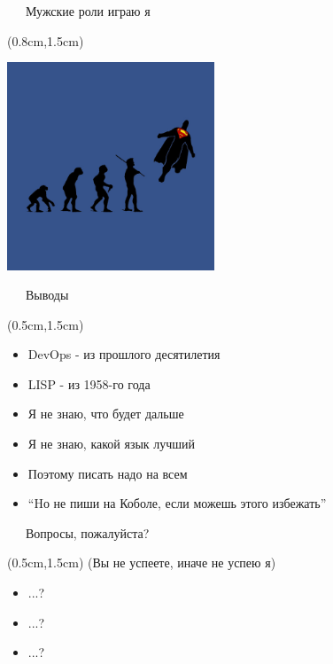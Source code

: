 \documentclass[xetex,18pt,aspectratio=43]{beamer}
\begin{document}
\begin{Large}
\begin{frame}{\ \ \ Мужские роли играю я}
\begin{textblock*}{\framewidth}(0.8cm,1.5cm)
\begin{minipage}{\textwidth}
  \centering
  \includegraphics[height=6.2cm]{img/superman}
\end{minipage}
\end{textblock*}
\end{frame}

\begin{frame}{\ \ \ Выводы}
\begin{textblock*}{\framewidth-0.8cm}(0.5cm,1.5cm)
\begin{itemize}
  \item DevOps - из прошлого десятилетия
  \item LISP - из 1958-го года
  \item Я не знаю, что будет дальше
  \item Я не знаю, какой язык лучший
  \item Поэтому писать надо на всем
  \item \enquote{Hо не пиши на Коболе, если можешь этого избежать}
\end{itemize}
\end{textblock*}
\end{frame}

\begin{frame}{\ \ \ Вопросы, пожалуйста?}
\begin{textblock*}{\framewidth-0.8cm}(0.5cm,1.5cm)
  (Вы не успеете, иначе не успею я)
\begin{itemize}
  \item ...?
  \item ...?
  \item ...?
\end{itemize}
\end{textblock*}
\end{frame}


\end{Large}
\end{document}
